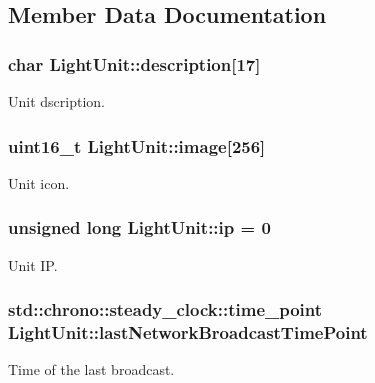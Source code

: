 \subsection{Member Data Documentation}
\subsubsection[{\texorpdfstring{description}{description}}]{\setlength{\rightskip}{0pt plus 5cm}char Light\+Unit\+::description\mbox{[}17\mbox{]}}\hypertarget{classLightUnit_aad36ad5ba65b93a30ee35ef1f6895b5a}{}\label{classLightUnit_aad36ad5ba65b93a30ee35ef1f6895b5a}
Unit dscription. 
\subsubsection[{\texorpdfstring{image}{image}}]{\setlength{\rightskip}{0pt plus 5cm}uint16\+\_\+t Light\+Unit\+::image\mbox{[}256\mbox{]}}\hypertarget{classLightUnit_a01f65fda0c55ecd8b1d62911cfa688d2}{}\label{classLightUnit_a01f65fda0c55ecd8b1d62911cfa688d2}
Unit icon. 
\subsubsection[{\texorpdfstring{ip}{ip}}]{\setlength{\rightskip}{0pt plus 5cm}unsigned long Light\+Unit\+::ip = 0}\hypertarget{classLightUnit_a7d490bbccb134d200628eee46ab8fb3d}{}\label{classLightUnit_a7d490bbccb134d200628eee46ab8fb3d}
Unit IP. 
\subsubsection[{\texorpdfstring{last\+Network\+Broadcast\+Time\+Point}{lastNetworkBroadcastTimePoint}}]{\setlength{\rightskip}{0pt plus 5cm}std\+::chrono\+::steady\+\_\+clock\+::time\+\_\+point Light\+Unit\+::last\+Network\+Broadcast\+Time\+Point}\hypertarget{classLightUnit_ac5f86e26fe02c192736cddd1d06af583}{}\label{classLightUnit_ac5f86e26fe02c192736cddd1d06af583}
Time of the last broadcast. 
